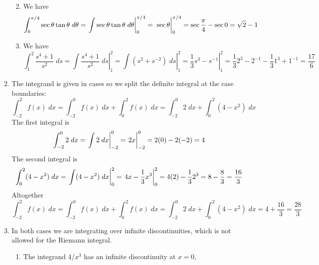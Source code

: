 \documentclass{article}
\begin{document}
\begin{enumerate}
\begin{enumerate}
\begin{equation*}
    \end{equation*}
  \item We have
    \begin{equation*}
      \int_0^{\pi/4} \sec\theta \tan\theta \; d\theta
      = \left. \int \sec\theta \tan\theta \; d\theta \right|_0^{\pi/4}
      = \left. \vphantom{\int} \sec\theta \right|_0^{\pi/4}
      = \sec\frac{\pi}{4} - \sec{0} = \sqrt{2} - 1
    \end{equation*}
  \item We have
    \begin{equation*}
      \int_1^2 \frac{s^4+1}{s^2} \; ds
      = \left. \int \frac{s^4+1}{s^2} \; ds \right|_1^2
      = \left. \int \left(s^2 + s^{-2}\right) \; ds \right|_1^2
      = \left. \frac{1}{3} s^3 - s^{-1} \right|_1^2
      = \frac{1}{3}2^3 - 2^{-1} - \frac{1}{3}1^3 + 1^{-1}
      = \frac{17}{6}
    \end{equation*}
  \end{enumerate}
\item The integrand is given in cases so we split the definite
  integral at the case boundaries:
  \begin{equation*}
    \int_{-2}^2 f(x) \; dx = \int_{-2}^0 f(x) \; dx + \int_0^2 f(x) \;
    dx
    = \int_{-2}^0 2 \; dx + \int_0^2 (4-x^2) \; dx
  \end{equation*}
  The first integral is
  \begin{equation*}
    \int_{-2}^0 2 \; dx = \left. \int 2 \; dx \right|_{-2}^0
    = \left. \vphantom{\int} 2x \right|_{-2}^0 = 2(0) - 2(-2) = 4
  \end{equation*}
  The second integral is
  \begin{equation*}
    \int_0^2 (4-x^2) \; dx
    = \left. \int (4-x^2) \; dx \right|_0^2
    = \left. \vphantom{\int} 4x - \frac{1}{3} x^3 \right|_0^2
    = 4(2) - \frac{1}{3} 2^3 = 8 - \frac{8}{3} = \frac{16}{3}
  \end{equation*}
  Altogether
  \begin{equation*}
    \int_{-2}^2 f(x) \; dx = \int_{-2}^0 f(x) \; dx + \int_0^2 f(x) \;
    dx
    = \int_{-2}^0 2 \; dx + \int_0^2 (4-x^2) \; dx = 4 + \frac{16}{3}
    = \frac{28}{3}
  \end{equation*}
\item In both cases we are integrating over infinite discontinuities,
  which is not allowed for the Riemann integral.
  \begin{enumerate}
  \item The integrand $4/x^3$ has an infinite discontinuity at $x=0$,

\end{enumerate}
\end{enumerate}
\end{document}
